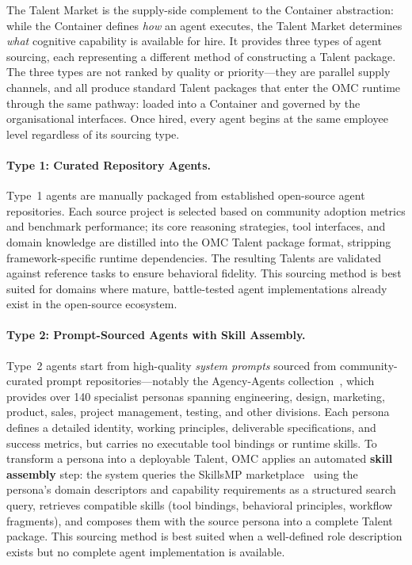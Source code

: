 The Talent Market is the supply-side complement to the Container abstraction: while the Container defines \emph{how} an agent executes, the Talent Market determines \emph{what} cognitive capability is available for hire. It provides three types of agent sourcing, each representing a different method of constructing a Talent package. The three types are not ranked by quality or priority---they are parallel supply channels, and all produce standard Talent packages that enter the OMC runtime through the same pathway: loaded into a Container and governed by the organisational interfaces. Once hired, every agent begins at the same employee level regardless of its sourcing type.

\paragraph{Type 1: Curated Repository Agents.}
Type~1 agents are manually packaged from established open-source agent repositories. Each source project is selected based on community adoption metrics and benchmark performance; its core reasoning strategies, tool interfaces, and domain knowledge are distilled into the OMC Talent package format, stripping framework-specific runtime dependencies. The resulting Talents are validated against reference tasks to ensure behavioral fidelity. This sourcing method is best suited for domains where mature, battle-tested agent implementations already exist in the open-source ecosystem.

\paragraph{Type 2: Prompt-Sourced Agents with Skill Assembly.}
Type~2 agents start from high-quality \emph{system prompts} sourced from community-curated prompt repositories---notably the Agency-Agents collection~\cite{agencyagents}, which provides over 140 specialist personas spanning engineering, design, marketing, product, sales, project management, testing, and other divisions. Each persona defines a detailed identity, working principles, deliverable specifications, and success metrics, but carries no executable tool bindings or runtime skills. To transform a persona into a deployable Talent, OMC applies an automated \textbf{skill assembly} step: the system queries the SkillsMP marketplace~\cite{skillsmp} using the persona’s domain descriptors and capability requirements as a structured search query, retrieves compatible skills (tool bindings, behavioral principles, workflow fragments), and composes them with the source persona into a complete Talent package. This sourcing method is best suited when a well-defined role description exists but no complete agent implementation is available.

